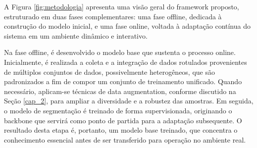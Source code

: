 

A Figura \ref{fig:metodologia} apresenta uma visão geral do framework proposto, estruturado em duas fases complementares: uma fase offline, dedicada à construção do modelo inicial, e uma fase online, voltada à adaptação contínua do sistema em um ambiente dinâmico e interativo.


Na fase offline,
é desenvolvido o modelo base que sustenta o processo online. Inicialmente, é realizada a coleta e a integração de dados rotulados provenientes de múltiplos conjuntos de dados, possivelmente heterogêneos, que são padronizados a fim de compor um conjunto de treinamento unificado. Quando necessário, aplicam-se técnicas de data augmentation, conforme discutido na Seção \ref{cap_2}, para ampliar a diversidade e a robustez das amostras. Em seguida, o modelo de segmentação é treinado de forma supervisionada, originando o backbone que servirá como ponto de partida para a adaptação subsequente. O resultado desta etapa é, portanto, um modelo base treinado, que concentra o conhecimento essencial antes de ser transferido para operação no ambiente real.

